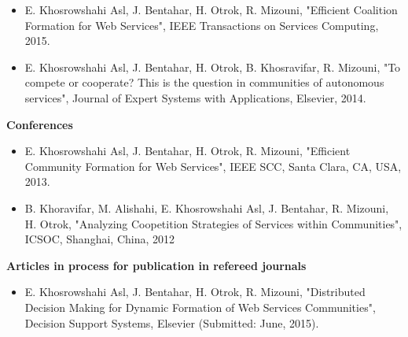 \begin{itemize}
\item E. Khosrowshahi Asl, J. Bentahar, H. Otrok, R. Mizouni, "Efficient Coalition Formation for Web Services", IEEE Transactions on Services Computing, 2015.

\item E. Khosrowshahi Asl, J. Bentahar, H. Otrok, B. Khosravifar, R. Mizouni, "To compete or cooperate? This is the question in communities of autonomous services", Journal of Expert Systems with Applications, Elsevier, 2014.


\end{itemize}

\textbf{Conferences}

\begin{itemize}
\item E. Khosrowshahi Asl, J. Bentahar, H. Otrok, R. Mizouni, "Efficient Community Formation for Web Services", IEEE SCC, Santa Clara, CA, USA, 2013.

\item B. Khoravifar, M. Alishahi, E. Khosrowshahi Asl, J. Bentahar, R. Mizouni, H. Otrok, "Analyzing Coopetition Strategies of Services within Communities", ICSOC, Shanghai, China, 2012




\end{itemize}

\textbf{Articles in process for publication in refereed journals}

\begin{itemize}
\item E. Khosrowshahi Asl, J. Bentahar, H. Otrok, R. Mizouni, "Distributed Decision Making for Dynamic Formation of Web Services Communities", Decision Support Systems, Elsevier (Submitted: June, 2015).
\end{itemize}

